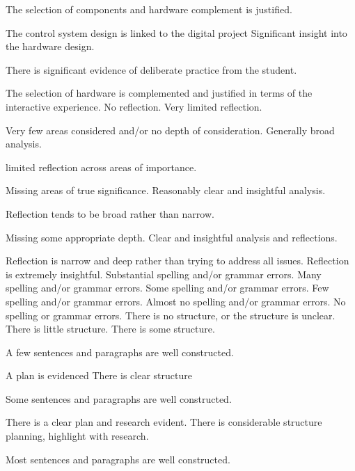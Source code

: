 \documentclass{../../fal_assignment}
\begin{document}
\begin{markingrubric}
	\par The selection of components and hardware complement is justified.
	\par The control system design is linked to the digital project
	\grade Significant insight into the hardware design.
	\par There is significant evidence of deliberate practice from the student.
	\par The selection of hardware is complemented and justified in terms of the interactive experience.
	\grade\fail 	No reflection.
	\grade 		Very limited reflection.
	\par Very few areas considered and/or no depth of consideration.
	\grade 		Generally broad analysis.  
	\par limited reflection across areas of importance.
	\par Missing areas of true significance. 
	\grade 		Reasonably clear and insightful analysis.
	\par Reflection tends to be broad rather than narrow.
	\par Missing some appropriate depth. 
	\grade 		Clear and insightful analysis and reflections.
	\par Reflection is narrow and deep rather than trying to address all issues.
	\grade 		Reflection is extremely insightful.
	\grade\fail 	Substantial spelling and/or grammar errors.
	\grade 		Many spelling and/or grammar errors.
	\grade 		Some spelling and/or grammar errors.  
	\grade 		Few spelling and/or grammar errors.
	\grade 		Almost no spelling and/or grammar errors.
	\grade 		No spelling or grammar errors.
    \grade\fail 	There is no structure, or the structure is unclear.
	\grade 		There is little structure.
	\grade 		There is some structure.
	\par 		A few sentences and paragraphs are well constructed.
	\par 	  	A plan is evidenced
	\grade 		There is clear structure
	\par 		Some sentences and paragraphs are well constructed.
	\par 		There is a clear plan and research evident.
	\grade 		There is considerable structure planning, highlight with research.
	\par 		Most sentences and paragraphs are well constructed.

\end{markingrubric}
\end{document}
